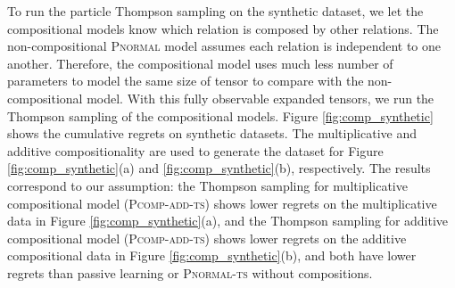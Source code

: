 To run the particle Thompson sampling on the synthetic dataset, we let the
compositional models know which relation is composed by other relations.
The non-compositional \textsc{Pnormal} model assumes each relation is independent to one another.
Therefore, the compositional model uses much less number of parameters to model
the same size of tensor to compare with the non-compositional model.
With this fully observable expanded tensors, we run the Thompson sampling of
the compositional models.
Figure \ref{fig:comp_synthetic} shows the cumulative regrets on synthetic
datasets. The multiplicative and additive compositionality are used to
generate the dataset for Figure \ref{fig:comp_synthetic}(a) and
\ref{fig:comp_synthetic}(b), respectively. The results correspond to our
assumption: the Thompson sampling for multiplicative compositional model (\textsc{Pcomp-add-ts}) shows lower
regrets on the multiplicative data in Figure \ref{fig:comp_synthetic}(a), and
the Thompson sampling for additive compositional model (\textsc{Pcomp-add-ts}) shows lower regrets on the
additive compositional data in Figure \ref{fig:comp_synthetic}(b),
and both have lower regrets than passive learning or \textsc{Pnormal-ts} without compositions.